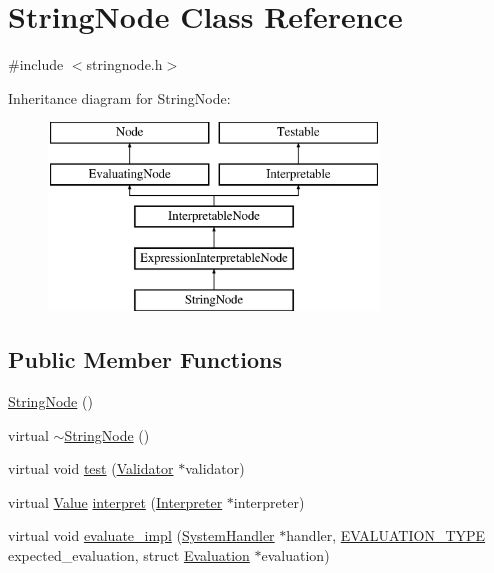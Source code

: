 \hypertarget{classStringNode}{}\section{String\+Node Class Reference}
\label{classStringNode}


{\ttfamily \#include $<$stringnode.\+h$>$}

Inheritance diagram for String\+Node\+:\begin{figure}[H]
\begin{center}
\leavevmode
\includegraphics[height=5.000000cm]{classStringNode}
\end{center}
\end{figure}
\subsection*{Public Member Functions}
\begin{DoxyCompactItemize}
\item 
\hyperlink{classStringNode_a3ac1767041e5519e52ada6e7c5ecbbe4}{String\+Node} ()
\item 
virtual \hyperlink{classStringNode_a2b2f8f89db3402822e55da8ede0ca443}{$\sim$\+String\+Node} ()
\item 
virtual void \hyperlink{classStringNode_a3836ad2a1bb6f86cd52663653a65bad8}{test} (\hyperlink{classValidator}{Validator} $\ast$validator)
\item 
virtual \hyperlink{classValue}{Value} \hyperlink{classStringNode_ae92c0858cd07baf0c6417f7bdfce9f0d}{interpret} (\hyperlink{classInterpreter}{Interpreter} $\ast$interpreter)
\item 
virtual void \hyperlink{classStringNode_a1399a24e093f4ecd00957268923c5d23}{evaluate\+\_\+impl} (\hyperlink{classSystemHandler}{System\+Handler} $\ast$handler, \hyperlink{statics_8h_a6664c451ca7787483a7981cc1de68dbb}{E\+V\+A\+L\+U\+A\+T\+I\+O\+N\+\_\+\+T\+Y\+PE} expected\+\_\+evaluation, struct \hyperlink{structEvaluation}{Evaluation} $\ast$evaluation)
\end{DoxyCompactItemize}
